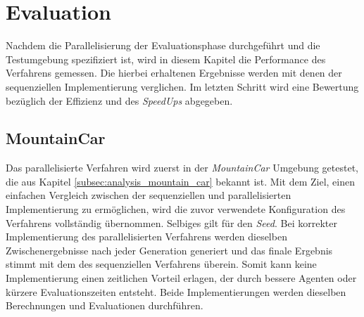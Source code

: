 \section{Evaluation}
\label{sec:evaluation_parallel}
Nachdem die Parallelisierung der Evaluationsphase durchgeführt und die Testumgebung spezifiziert ist, wird in diesem Kapitel die Performance des Verfahrens gemessen. Die hierbei erhaltenen Ergebnisse werden mit denen der sequenziellen Implementierung verglichen. Im letzten Schritt wird eine Bewertung bezüglich der Effizienz und des \emph{SpeedUps} abgegeben.

\subsection{MountainCar}
\label{subsec:mountain_car_optimzation}
Das parallelisierte Verfahren wird zuerst in der \emph{MountainCar} Umgebung getestet, die aus Kapitel \ref{subsec:analysis_mountain_car} bekannt ist. Mit dem Ziel, einen einfachen Vergleich zwischen der sequenziellen und parallelisierten Implementierung zu ermöglichen, wird die zuvor verwendete Konfiguration des Verfahrens vollständig übernommen. Selbiges gilt für den \emph{Seed}. Bei korrekter Implementierung des parallelisierten Verfahrens werden dieselben Zwischenergebnisse nach jeder Generation generiert und das finale Ergebnis stimmt mit dem des sequenziellen Verfahrens überein. Somit kann keine Implementierung einen zeitlichen Vorteil erlagen, der durch bessere Agenten oder kürzere Evaluationszeiten entsteht. Beide Implementierungen werden dieselben Berechnungen und Evaluationen durchführen.
